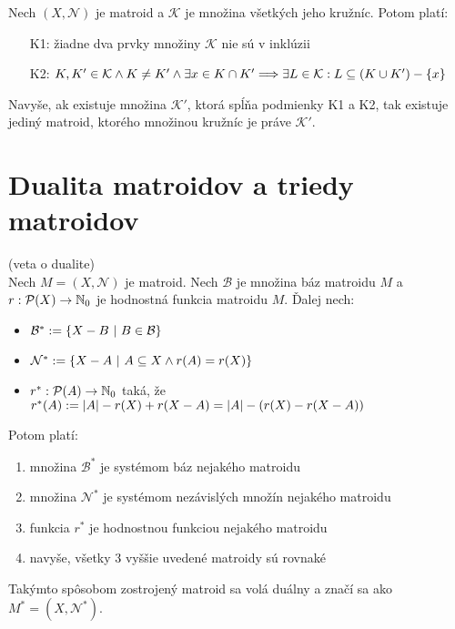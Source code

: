 \begin{theorem}
Nech $(X, \mathcal{N})$ je matroid a $\mathcal{K}$ je množina všetkých jeho kružníc. Potom platí:
\begin{enumerate}
    \item[K1:] žiadne dva prvky množiny $\mathcal{K}$ nie sú v inklúzii
    \item[K2:] $K, K' \in \mathcal{K} \wedge K \neq K' \wedge \exists x \in K \cap K' \Longrightarrow \exists L \in \mathcal{K}: L \subseteq (K \cup K') - \left\{x\right\}$
\end{enumerate}

Navyše, ak existuje množina $\mathcal{K}'$, ktorá spĺňa podmienky K1 a K2, tak existuje jediný matroid, ktorého množinou kružníc je práve $\mathcal{K}'$.
\end{theorem}

\section{Dualita matroidov a triedy matroidov}

\begin{theorem}{(veta o dualite)}\\
Nech $M = (X, \mathcal{N})$ je matroid. Nech $\mathcal{B}$ je množina báz matroidu $M$ a $r:\mathcal{P}(X) \to \mathbb{N}_0$ je hodnostná funkcia matroidu $M$.
Ďalej nech:
\begin{itemize}
    \item $\mathcal{B}^* := \left\{X - B ~|~ B \in \mathcal{B}\right\}$
    \item $\mathcal{N}^* := \left\{X - A ~|~ A \subseteq X \wedge r(A) = r(X)\right\}$
    \item $r^*: \mathcal{P}(A) \to \mathbb{N}_0$ taká, že $r^*(A) := \left|A\right| - r(X) + r(X - A) = \left|A\right| - (r(X) - r(X-A))$
\end{itemize}

\noindent
Potom platí:
\begin{enumerate}
    \item množina $\mathcal{B}^*$ je systémom báz nejakého matroidu
    \item množina $\mathcal{N}^*$ je systémom nezávislých množín nejakého matroidu
    \item funkcia $r^*$ je hodnostnou funkciou nejakého matroidu
    \item navyše, všetky 3 vyššie uvedené matroidy sú rovnaké
\end{enumerate}

\noindent
Takýmto spôsobom zostrojený matroid sa volá duálny a značí sa ako $M^* = (X, \mathcal{N}^*)$.

\end{theorem}

